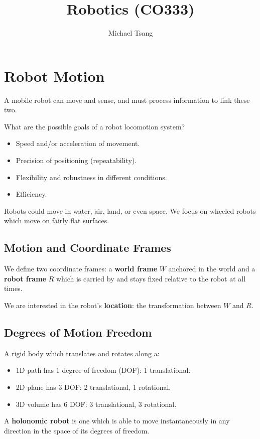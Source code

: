 \documentclass[11pt]{article}
\title{Robotics (CO333)}
\author{Michael Tsang}
\begin{document}
\maketitle

\section{Robot Motion}
A mobile robot can move and sense, and must process information to link these two.

What are the possible goals of a robot locomotion system?
\begin{itemize}
  \item Speed and/or acceleration of movement.
  \item Precision of positioning (repeatability).
  \item Flexibility and robustness in different conditions.
  \item Efficiency.
\end{itemize}

Robots could move in water, air, land, or even space.
We focus on wheeled robots which move on fairly flat surfaces.

\subsection{Motion and Coordinate Frames}
We define two coordinate frames: a \textbf{world frame} $W$ anchored in the world and a \textbf{robot frame} $R$ which is carried by and stays fixed relative to the robot at all times.

We are interested in the robot's \textbf{location}: the transformation between $W$ and $R$.

\subsection{Degrees of Motion Freedom}
A rigid body which translates and rotates along a:
\begin{itemize}
  \item 1D path has 1 degree of freedom (DOF): 1 translational.
  \item 2D plane has 3 DOF: 2 translational, 1 rotational.
  \item 3D volume has 6 DOF: 3 translational, 3 rotational.
\end{itemize}

A \textbf{holonomic robot} is one which is able to move instantaneously in any direction in the space of its degrees of freedom.
\end{document}
